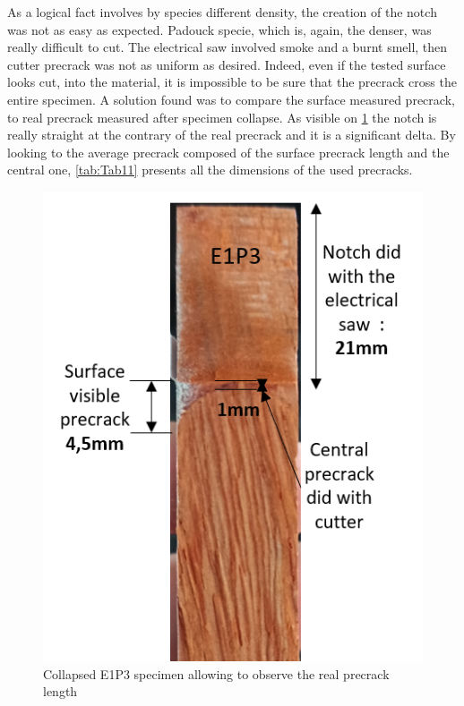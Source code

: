 As a logical fact involves by species different density, the creation of the notch was not as easy as expected. Padouck specie, which is, again, the denser, was really difficult to cut. The electrical saw involved smoke and a burnt smell, then cutter precrack was not as uniform as desired. Indeed, even if the tested surface looks cut, into the material, it is impossible to be sure that the precrack cross the entire specimen. A solution found was to compare the surface measured precrack, to real precrack measured after specimen collapse. As visible on \ref{fig:Precrack} the notch is really straight at the contrary of the real precrack and it is a significant delta. By looking to the average precrack composed of the surface precrack length and the central one, \ref{tab:Tab11} presents all the dimensions of the used precracks.
\begin{figure}[h]
	\centering
	\includegraphics[scale=0.8]{Figures/Precrack}
	\decoRule
	\caption[Collapsed specimen]{Collapsed E1P3 specimen allowing to observe the real precrack length}
	\label{fig:Precrack}
\end{figure}

